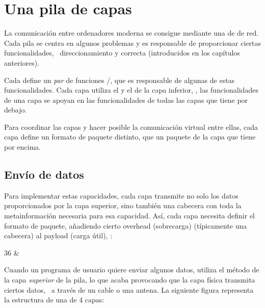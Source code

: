 

\chapter{Una pila de capas}\label{sec:stack_layers}

La comunicación entre ordenadores moderna se consigue mediante una
 de  de red.
Cada pila se centra en algunos problemas y es responsable de
proporcionar ciertas funcionalidades, \eg\ 
direccionamiento y  correcta (introducidos en los capítulos anteriores).

Cada  define un \textit{par} de funciones /,
que es responsable de algunas de estas funcionalidades.
% 
Cada capa utiliza el  y el  de la capa inferior,
\ie, las funcionalidades de una capa se apoyan en las funcionalidades de todas las capas que tiene por debajo.

Para coordinar las capas y hacer posible la comunicación virtual entre ellas,
cada capa define un formato de paquete distinto, que 
un paquete de la capa que tiene por encima.


\section{Envío de datos}\label{sec:stack_layers:send}

Para implementar estas
capacidades, cada capa transmite no solo los datos proporcionados por la capa superior,
sino también una cabecera con toda la metainformación necesaria para esa capacidad. Así, cada capa necesita definir
el formato de paquete, añadiendo cierto overhead (sobrecarga) (típicamente una cabecera) al payload (carga útil), \eg:

\begin{center}
    \begin{bytefield}{36}
      & 
    \end{bytefield}
\end{center}



Cuando un programa de usuario quiere enviar algunos datos, utiliza el método  de la capa \textit{superior} de la pila,
lo que acaba provocando que la capa física transmita ciertos datos, \eg\ a través de un cable o una antena.
La siguiente figura representa la estructura de una \conceptRef{stack}{pila de red} de 4 capas:

